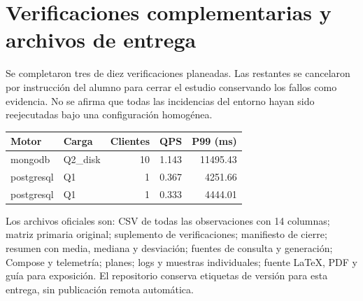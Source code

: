 \documentclass[11pt,letterpaper]{article}
\begin{document}
\section{Verificaciones complementarias y archivos de entrega}
Se completaron tres de diez verificaciones planeadas. Las restantes se cancelaron por instrucción del alumno para cerrar el estudio conservando los fallos como evidencia. No se afirma que todas las incidencias del entorno hayan sido reejecutadas bajo una configuración homogénea.
\begin{center}\small\begin{tabular}{llrrr}\toprule Motor & Carga & Clientes & QPS & P99 (ms)\\\midrule
mongodb & Q2\_disk & 10 & 1.143 & 11495.43\\
postgresql & Q1 & 1 & 0.367 & 4251.66\\
postgresql & Q1 & 1 & 0.333 & 4444.01\\
\bottomrule\end{tabular}\end{center}
Los archivos oficiales son: CSV de todas las observaciones con 14 columnas; matriz primaria original; suplemento de verificaciones; manifiesto de cierre; resumen con media, mediana y desviación; fuentes de consulta y generación; Compose y telemetría; planes; logs y muestras individuales; fuente LaTeX, PDF y guía para exposición. El repositorio conserva etiquetas de versión para esta entrega, sin publicación remota automática.
\end{document}
